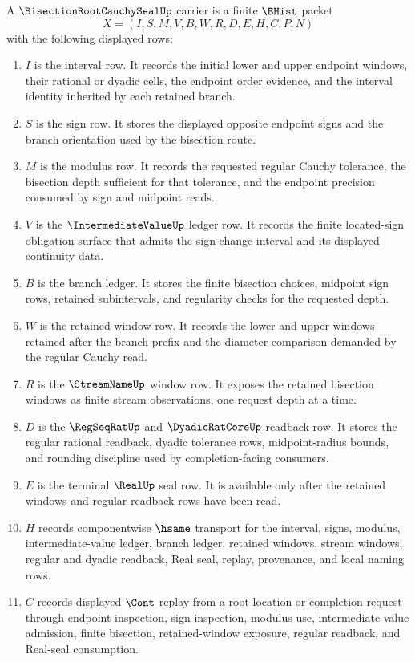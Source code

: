 \begin{definition}
\label{def:bisection-root-cauchy-seal-carrier}
A $\BisectionRootCauchySealUp$ carrier is a finite $\BHist$ packet
$$
X=(I,S,M,V,B,W,R,D,E,H,C,P,N)
$$
with the following displayed rows:
\begin{enumerate}
\item $I$ is the interval row. It records the initial lower and upper endpoint windows, their rational or dyadic cells, the endpoint order evidence, and the interval identity inherited by each retained branch.
\item $S$ is the sign row. It stores the displayed opposite endpoint signs and the branch orientation used by the bisection route.
\item $M$ is the modulus row. It records the requested regular Cauchy tolerance, the bisection depth sufficient for that tolerance, and the endpoint precision consumed by sign and midpoint reads.
\item $V$ is the $\IntermediateValueUp$ ledger row. It records the finite located-sign obligation surface that admits the sign-change interval and its displayed continuity data.
\item $B$ is the branch ledger. It stores the finite bisection choices, midpoint sign rows, retained subintervals, and regularity checks for the requested depth.
\item $W$ is the retained-window row. It records the lower and upper windows retained after the branch prefix and the diameter comparison demanded by the regular Cauchy read.
\item $R$ is the $\StreamNameUp$ window row. It exposes the retained bisection windows as finite stream observations, one request depth at a time.
\item $D$ is the $\RegSeqRatUp$ and $\DyadicRatCoreUp$ readback row. It stores the regular rational readback, dyadic tolerance rows, midpoint-radius bounds, and rounding discipline used by completion-facing consumers.
\item $E$ is the terminal $\RealUp$ seal row. It is available only after the retained windows and regular readback rows have been read.
\item $H$ records componentwise $\hsame$ transport for the interval, signs, modulus, intermediate-value ledger, branch ledger, retained windows, stream windows, regular and dyadic readback, Real seal, replay, provenance, and local naming rows.
\item $C$ records displayed $\Cont$ replay from a root-location or completion request through endpoint inspection, sign inspection, modulus use, intermediate-value admission, finite bisection, retained-window exposure, regular readback, and Real-seal consumption.

\end{enumerate}
\end{definition}
